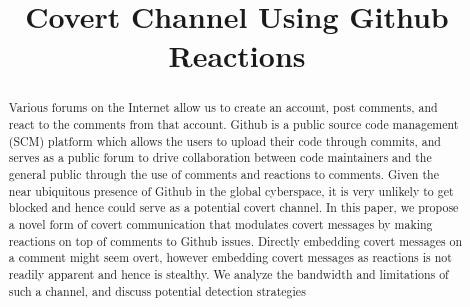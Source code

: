 \documentclass[conference]{IEEEtran}
\begin{document}
\title{Covert Channel Using Github Reactions \\
}

\author{
\and
{}
\and
{}
\and
{}
}

\maketitle

\begin{abstract}
Various forums on the Internet allow us to create an account, post comments, and react to the comments from that account. Github is a public source code management (SCM) platform which allows the users to upload their code through commits, and serves as a public forum to drive collaboration between code maintainers and the general public through the use of comments and reactions to comments. Given the near ubiquitous presence of Github in the global cyberspace, it is very unlikely to get blocked and hence could serve as a potential covert channel. In this paper, we propose a novel form of covert communication that modulates covert messages by making reactions on top of comments to Github issues. Directly embedding covert messages on a comment might seem overt, however embedding covert messages as reactions is not readily apparent and hence is stealthy. We analyze the bandwidth and limitations of such a channel, and discuss potential detection strategies

\end{abstract}
\end{document}
